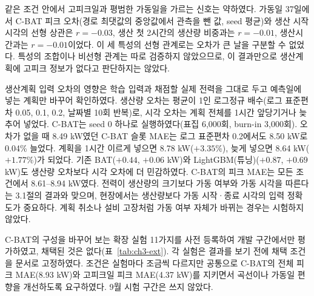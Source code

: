 같은 조건 안에서 고피크일과 평범한 가동일을 가르는 신호는 약하였다. 가동일 37일에서 C-BAT 피크 오차(경로 최댓값의 중앙값에서 관측을 뺀 값, seed 평균)와 생산 시작 시각의 선형 상관은 $r=-0.03$, 생산 첫 2시간의 생산량 비중과는 $r=-0.01$, 생산시간과는 $r=-0.01$이었다. 이 세 특성의 선형 관계로는 오차가 큰 날을 구분할 수 없었다. 특성의 조합이나 비선형 관계는 따로 검증하지 않았으므로, 이 결과만으로 생산계획에 고피크 정보가 없다고 판단하지는 않았다.

생산계획 입력 오차의 영향은 학습 입력과 채점할 실제 전력을 그대로 두고 예측일에 넣는 계획만 바꾸어 확인하였다. 생산량 오차는 평균이 1인 로그정규 배수(로그 표준편차 0.05, 0.1, 0.2, 날짜별 10회 반복)로, 시각 오차는 계획 전체를 1시간 앞당기거나 늦추어 넣었다. C-BAT는 seed 0 하나로 실행하였다(표집 6,000회, burn-in 3,000회). 오차가 없을 때 8.49 kW였던 C-BAT 슬롯 MAE는 로그 표준편차 0.2에서도 8.50 kW로 0.04\% 늘었다. 계획을 1시간 이르게 넣으면 8.78 kW($+3.35$\%), 늦게 넣으면 8.64 kW($+1.77$\%)가 되었다. 기존 BAT($+0.44$, $+0.06$ kW)와 LightGBM(튜닝)($+0.87$, $+0.69$ kW)도 생산량 오차보다 시각 오차에 더 민감하였다. C-BAT의 피크 MAE는 모든 조건에서 8.61--8.94 kW였다. 전력이 생산량의 크기보다 가동 여부와 가동 시각을 따른다는 3.1절의 결과와 맞으며, 현장에서는 생산량보다 가동 시작·종료 시각의 입력 정확도가 중요하다. 계획 취소나 설비 고장처럼 가동 여부 자체가 바뀌는 경우는 시험하지 않았다.

C-BAT의 구성을 바꾸어 보는 확장 실험 11가지를 사전 등록하여 개발 구간에서만 평가하였고, 채택된 것은 없다(표~\ref{tab:ch3-ext}). 각 실험은 결과를 보기 전에 채택 조건을 문서로 고정하였다. 조건은 실험마다 조금씩 다르지만 공통으로 C-BAT의 전체 피크 MAE(8.93 kW)와 고피크일 피크 MAE(4.37 kW)를 지키면서 곡선이나 가동일 편향을 개선하도록 요구하였다. 9월 시험 구간은 쓰지 않았다.

